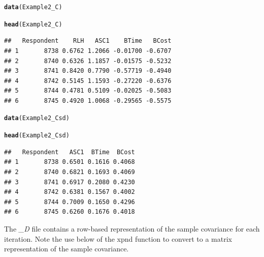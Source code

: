 \documentclass{article}\usepackage[]{graphicx}\usepackage[]{color}
\makeatletter
\newcommand{\hlstd}[1]{\textcolor[rgb]{0.345,0.345,0.345}{#1}}%
\newcommand{\hlkwd}[1]{\textcolor[rgb]{0.737,0.353,0.396}{\textbf{#1}}}%
\newenvironment{kframe}{%
 \def\at@end@of@kframe{}%
 \ifinner\ifhmode%
  \def\at@end@of@kframe{\end{minipage}}%
  \begin{minipage}{\columnwidth}%
 \fi\fi%
 \def\FrameCommand##1{\hskip\@totalleftmargin \hskip-\fboxsep
 \colorbox{shadecolor}{##1}\hskip-\fboxsep
     \hskip-\linewidth \hskip-\@totalleftmargin \hskip\columnwidth}%
 \MakeFramed {\advance\hsize-\width
   \@totalleftmargin\z@ \linewidth\hsize
   \@setminipage}}%
 {\par\unskip\endMakeFramed%
 \at@end@of@kframe}
\newenvironment{knitrout}{}{} %
\makeatother
\begin{document}
\begin{knitrout}
\color{fgcolor}\begin{kframe}
\begin{alltt}
\hlkwd{data}\hlstd{(Example2_C)}

\hlkwd{head}\hlstd{(Example2_C)}
\end{alltt}
\begin{verbatim}
##   Respondent    RLH   ASC1    BTime   BCost
## 1       8738 0.6762 1.2066 -0.01700 -0.6707
## 2       8740 0.6326 1.1857 -0.01575 -0.5232
## 3       8741 0.8420 0.7790 -0.57719 -0.4940
## 4       8742 0.5145 1.1593 -0.27220 -0.6376
## 5       8744 0.4781 0.5109 -0.02025 -0.5083
## 6       8745 0.4920 1.0068 -0.29565 -0.5575
\end{verbatim}
\begin{alltt}
\hlkwd{data}\hlstd{(Example2_Csd)}

\hlkwd{head}\hlstd{(Example2_Csd)}
\end{alltt}
\begin{verbatim}
##   Respondent   ASC1  BTime  BCost
## 1       8738 0.6501 0.1616 0.4068
## 2       8740 0.6821 0.1693 0.4069
## 3       8741 0.6917 0.2080 0.4230
## 4       8742 0.6381 0.1567 0.4002
## 5       8744 0.7009 0.1650 0.4296
## 6       8745 0.6260 0.1676 0.4018
\end{verbatim}
\end{kframe}
\end{knitrout}



The \emph{\_D} file contains a row-based representation of the sample covariance for each iteration. Note the use below of the xpnd function to convert to a matrix representation of the sample covariance.
\end{document}
